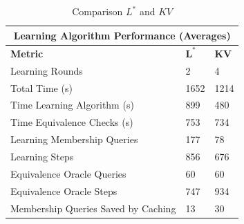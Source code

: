 \begin{table}[h]
	\centering
	\begin{tabular}{ |p{6.5cm}||p{1cm}|p{1cm}|  }
		\hline
		\multicolumn{3}{|c|}{\textbf{Learning Algorithm Performance (Averages)}} \\
		\hline
		\textbf{Metric} & $\mathbf{L^*}$ & $\mathbf{KV}$ \\
		\hline
		Learning Rounds							&	2				&	4 				\\
		Total Time (s)							&   1652			& 	1214   			\\
		Time Learning Algorithm	(s)				&	899				& 	480	\\
		Time Equivalence Checks (s)				& 	753				& 	734			\\
		Learning Membership Queries 			&   177				& 	78		\\
		Learning Steps							& 	856	  			& 	676   			\\
		Equivalence Oracle Queries				& 	60  			&  	60				\\
		Equivalence Oracle Steps				& 	747  			&  	934				\\
		Membership Queries Saved by Caching		& 	13  			&  	30				\\
		\hline
	\end{tabular}
	\caption{Comparison $L^*$ and $KV$}
	\label{tab:compkvlstar}
\end{table}


